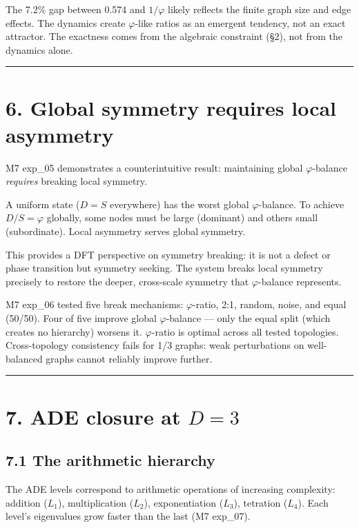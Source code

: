 \documentclass[11pt,a4paper]{article}
\begin{document}
The 7.2\% gap between 0.574 and $1/\varphi$ likely reflects the finite graph size and edge effects. The dynamics create $\varphi$-like ratios as an emergent tendency, not an exact attractor. The exactness comes from the algebraic constraint (§2), not from the dynamics alone.

\begin{center}\rule{0.5\linewidth}{0.4pt}\end{center}

\section*{6. Global symmetry requires local asymmetry}

M7 exp\_05 demonstrates a counterintuitive result: maintaining global $\varphi$-balance \emph{requires} breaking local symmetry.

A uniform state ($D = S$ everywhere) has the worst global $\varphi$-balance. To achieve $D/S = \varphi$ globally, some nodes must be large (dominant) and others small (subordinate). Local asymmetry serves global symmetry.

This provides a DFT perspective on symmetry breaking: it is not a defect or phase transition but symmetry seeking. The system breaks local symmetry precisely to restore the deeper, cross-scale symmetry that $\varphi$-balance represents.

M7 exp\_06 tested five break mechanisms: $\varphi$-ratio, 2:1, random, noise, and equal (50/50). Four of five improve global $\varphi$-balance — only the equal split (which creates no hierarchy) worsens it. $\varphi$-ratio is optimal across all tested topologies. Cross-topology consistency fails for 1/3 graphs: weak perturbations on well-balanced graphs cannot reliably improve further.

\begin{center}\rule{0.5\linewidth}{0.4pt}\end{center}

\section*{7. ADE closure at $D = 3$}

\subsection*{7.1 The arithmetic hierarchy}

The ADE levels correspond to arithmetic operations of increasing complexity: addition ($L_1$), multiplication ($L_2$), exponentiation ($L_3$), tetration ($L_4$). Each level's eigenvalues grow faster than the last (M7 exp\_07).
\end{document}
